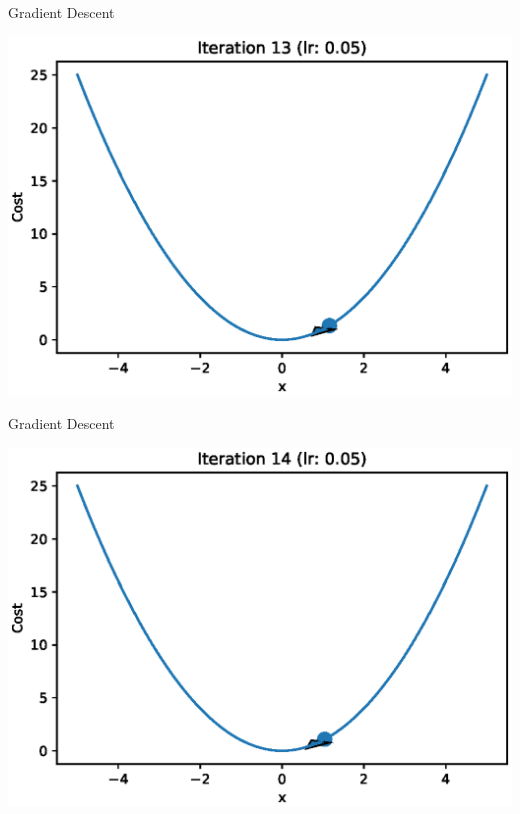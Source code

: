 \documentclass{beamer}
\begin{document}
	\begin{frame}{Gradient Descent}
		\begin{center}
			\includegraphics[totalheight=6cm]{gradient-descent/iteration-13.eps}
		\end{center}
	\end{frame}
	
	\begin{frame}{Gradient Descent}
		\begin{center}
			\includegraphics[totalheight=6cm]{gradient-descent/iteration-14.eps}
		\end{center}
	\end{frame}
	
\end{document}
